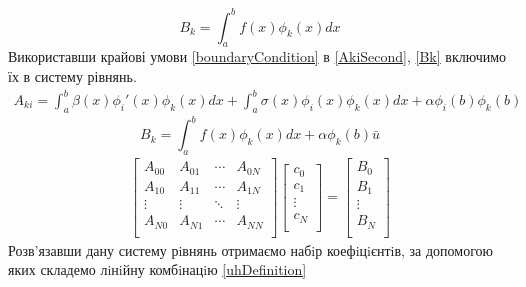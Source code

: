 \documentclass[a4paper]{article}
\numberwithin{equation}{section}
\begin{document}
\begin{equation}\label{Bk}
B_k = \int_a^b f(x)\phi_k(x)dx
\end{equation}
Використавши крайові умови \ref{boundaryCondition} в \ref{AkiSecond}, \ref{Bk} включимо їх в систему рівнянь.
\begin{equation}\label{AkiLast}
\begin{split}
A_{ki}= \int_a^b \beta(x) \phi_i'(x) \phi_k(x) dx+
\int_a^b \sigma(x) \phi_i(x) \phi_k(x) dx + \alpha \phi_i(b) \phi_k(b)  
\end{split}
\end{equation}
\begin{equation}\label{BkLast}
B_k=\int_a^bf(x)\phi_k(x)dx + \alpha \phi_k(b) \bar{u}
\end{equation}
\begin{eqnarray}\label{equationsSystem}
\begin{bmatrix}
A_{00} & A_{01} & \cdots & A_{0N} \\
A_{10} & A_{11} & \cdots & A_{1N} \\
\vdots & \vdots & \ddots & \vdots \\
A_{N0} & A_{N1} & \cdots & A_{NN} \\
\end{bmatrix}
\begin{bmatrix}
c_0 \\
c_1 \\
\vdots \\
c_N \\
\end{bmatrix}
=
\begin{bmatrix}
B_0 \\
B_1 \\
\vdots \\
B_N \\
\end{bmatrix}
\end{eqnarray}
Розв’язавши дану систему рiвнянь отримаємо набiр коефiцiєнтiв, за допомогою яких складемо лiнiйну комбiнацiю \ref{uhDefinition}
\end{document}
